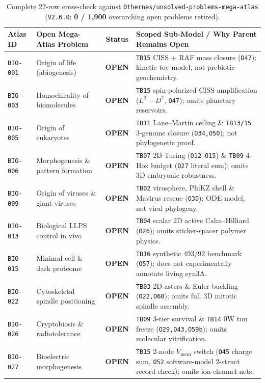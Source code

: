 \documentclass[11pt,reqno]{amsart}
\begin{document}
\begin{table}[t]
\centering
\caption{Complete 22-row cross-check against \nolinkurl{0thernes/unsolved-problems-mega-atlas} (\texttt{V2.6.0}; \textbf{0 / 1,900} overarching open problems retired).}
\label{tab:mega}
\scriptsize
\setlength{\tabcolsep}{3.2pt}
\renewcommand{\arraystretch}{0.91}
\begin{tabularx}{\textwidth}{@{}l l c L@{}}
\toprule
\textbf{Atlas ID} & \textbf{Open Mega-Atlas Problem} & \textbf{Status} & \textbf{Scoped Sub-Model / Why Parent Remains Open} \\
\midrule
\texttt{BIO-001} & Origin of life (abiogenesis) & \textbf{OPEN} & \texttt{TB15} CISS + RAF mass closure (\texttt{O47}); kinetic toy model, not prebiotic geochemistry. \\
\texttt{BIO-003} & Homochirality of biomolecules & \textbf{OPEN} & \texttt{TB15} spin-polarized CISS amplification ($L^2\!-\!D^2$, \texttt{O47}); omits planetary reservoirs. \\
\texttt{BIO-005} & Origin of eukaryotes & \textbf{OPEN} & \texttt{TB11} Lane--Martin ceiling \& \texttt{TB13/15} 3-genome closure (\texttt{O34,O50}); not phylogenetic proof. \\
\texttt{BIO-006} & Morphogenesis \& pattern formation & \textbf{OPEN} & \texttt{TB07} 2D Turing (\texttt{O12}--\texttt{O15}) \& \texttt{TB09} 4-Hox budget (\texttt{O27} literal sum); omits 3D embryonic robustness. \\
\texttt{BIO-009} & Origin of viruses \& giant viruses & \textbf{OPEN} & \texttt{TB02} virosphere, PhiKZ shell \& Mavirus rescue (\texttt{O30}); ODE model, not viral phylogeny. \\
\texttt{BIO-013} & Biological LLPS control in vivo & \textbf{OPEN} & \texttt{TB04} scalar 2D active Cahn--Hilliard (\texttt{O26}); omits sticker-spacer polymer physics. \\
\texttt{BIO-015} & Minimal cell \& dark proteome & \textbf{OPEN} & \texttt{TB16} synthetic 493/92 benchmark (\texttt{O57}); does not experimentally annotate living syn3A. \\
\texttt{BIO-022} & Cytoskeletal spindle positioning & \textbf{OPEN} & \texttt{TB03} 2D asters \& Euler buckling (\texttt{O22,O60}); omits full 3D mitotic spindle assembly. \\
\texttt{BIO-026} & Cryptobiosis \& radiotolerance & \textbf{OPEN} & \texttt{TB09} 3-tier survival \& \texttt{TB14} 0W tun freeze (\texttt{O29,O43,O59b}); omits molecular vitrification. \\
\texttt{BIO-027} & Bioelectric morphogenesis & \textbf{OPEN} & \texttt{TB15} 2-node $V_{\mathrm{mem}}$ switch (\texttt{O45} charge sum, \texttt{O52} software-model 2-struct record check); omits ion-channel nets. \\

\end{tabularx}
\end{table}
\end{document}
